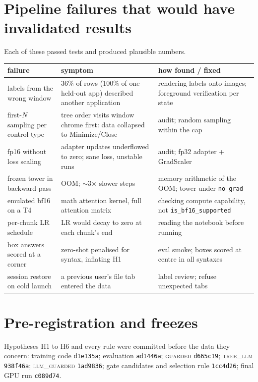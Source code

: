 \documentclass[11pt]{article}
\begin{document}
\section{Pipeline failures that would have invalidated results}
\label{app:failures}
Each of these passed tests and produced plausible numbers.
\begin{table}[H]
\centering\small
\begin{tabular}{p{4.2cm}p{5.2cm}p{4.6cm}}
\toprule
failure & symptom & how found / fixed \\
\midrule
labels from the wrong window & 36\% of rows (100\% of one held-out app) described another application & rendering labels onto images; foreground verification per state \\
first-$N$ sampling per control type & tree order visits window chrome first: data collapsed to Minimize/Close & audit; random sampling within the cap \\
fp16 without loss scaling & adapter updates underflowed to zero; sane loss, unstable runs & audit; fp32 adapter + GradScaler \\
frozen tower in backward pass & OOM; $\sim$3$\times$ slower steps & memory arithmetic of the OOM; tower under \texttt{no\_grad} \\
emulated bf16 on a T4 & math attention kernel, full attention matrix & checking compute capability, not \texttt{is\_bf16\_supported} \\
per-chunk LR schedule & LR would decay to zero at each chunk's end & reading the notebook before running \\
box answers scored at a corner & zero-shot penalised for syntax, inflating H1 & eval smoke; boxes scored at centre in all syntaxes \\
session restore on cold launch & a previous user's file tab entered the data & label review; refuse unexpected tabs \\
\bottomrule
\end{tabular}
\end{table}

\section{Pre-registration and freezes}
Hypotheses H1 to H6 and every rule were committed before the data they concern: training code
\texttt{d1e135a}; evaluation \texttt{ad1446a}; \textsc{guarded} \texttt{d665c19}; \textsc{tree\_llm}
\texttt{938f46a}; \textsc{llm\_guarded} \texttt{1ad9836}; gate candidates and selection rule
\texttt{1cc4d26}; final GPU run \texttt{c089d74}.
\end{document}
